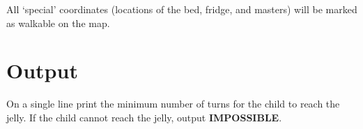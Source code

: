 All `special' coordinates (locations of the bed, fridge, and masters) will be
marked as walkable on the map.

\section*{Output}

On a single line print the minimum number of turns for the child to
reach the jelly. If the child cannot reach the jelly, output
\textbf{IMPOSSIBLE}.
